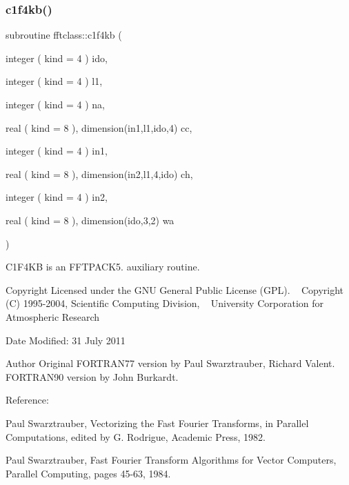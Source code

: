 \subsubsection{\texorpdfstring{c1f4kb()}{c1f4kb()}}
{\footnotesize\ttfamily subroutine fftclass\+::c1f4kb (\begin{DoxyParamCaption}\item[{integer ( kind = 4 )}]{ido,  }\item[{integer ( kind = 4 )}]{l1,  }\item[{integer ( kind = 4 )}]{na,  }\item[{real ( kind = 8 ), dimension(in1,l1,ido,4)}]{cc,  }\item[{integer ( kind = 4 )}]{in1,  }\item[{real ( kind = 8 ), dimension(in2,l1,4,ido)}]{ch,  }\item[{integer ( kind = 4 )}]{in2,  }\item[{real ( kind = 8 ), dimension(ido,3,2)}]{wa }\end{DoxyParamCaption})}



C1\+F4\+KB is an F\+F\+T\+P\+A\+C\+K5. auxiliary routine. 

\begin{DoxyCopyright}{Copyright}
Licensed under the G\+NU General Public License (G\+PL). ~\newline
 Copyright (C) 1995-\/2004, Scientific Computing Division, ~\newline
 University Corporation for Atmospheric Research 
\end{DoxyCopyright}
\begin{DoxyDate}{Date}
Modified\+: 31 July 2011 
\end{DoxyDate}
\begin{DoxyAuthor}{Author}
Original F\+O\+R\+T\+R\+A\+N77 version by Paul Swarztrauber, Richard Valent. ~\newline
 F\+O\+R\+T\+R\+A\+N90 version by John Burkardt.
\end{DoxyAuthor}
\begin{DoxyVerb}  Reference:

   Paul Swarztrauber,
   Vectorizing the Fast Fourier Transforms,
   in Parallel Computations,
   edited by G. Rodrigue,
   Academic Press, 1982.

   Paul Swarztrauber,
   Fast Fourier Transform Algorithms for Vector Computers,
   Parallel Computing, pages 45-63, 1984.\end{DoxyVerb}
 
